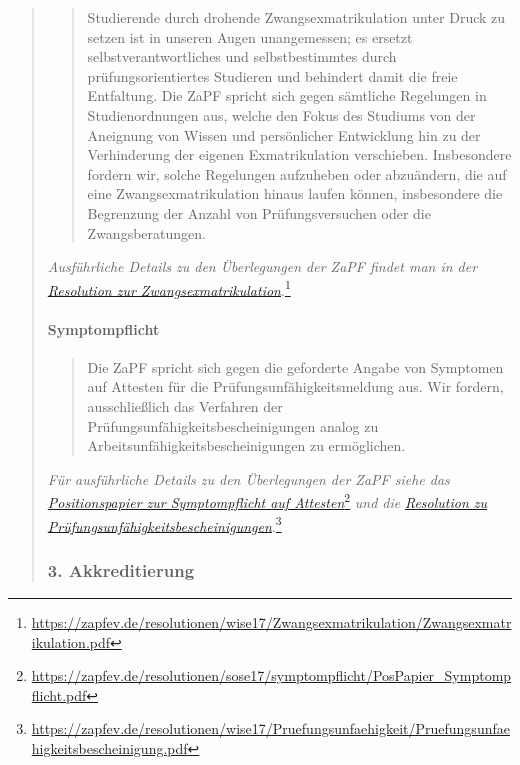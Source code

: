 \documentclass[DIV=14]{scrartcl}
\begin{document}
\begin{quote}
\begin{quote}
Studierende durch drohende Zwangsexmatrikulation unter Druck zu setzen ist in unseren Augen unangemessen; es ersetzt selbstverantwortliches und selbstbestimmtes durch prüfungsorientiertes Studieren und behindert damit die freie Entfaltung. Die ZaPF spricht sich gegen sämtliche Regelungen in Studienordnungen aus, welche den Fokus des Studiums von der Aneignung von Wissen und persönlicher Entwicklung hin zu der
Verhinderung der eigenen Exmatrikulation verschieben. Insbesondere fordern wir, solche Regelungen aufzuheben oder abzuändern, die auf eine Zwangsexmatrikulation hinaus laufen können, insbesondere die Begrenzung der Anzahl von Prüfungsversuchen oder die Zwangsberatungen.
\end{quote}

\emph{Ausführliche Details zu den Überlegungen der ZaPF findet man in der} \href{https://zapfev.de/resolutionen/wise17/Zwangsexmatrikulation/Zwangsexmatrikulation.pdf}{\emph{Resolution
zur Zwangsexmatrikulation}}.\footnote{\url{https://zapfev.de/resolutionen/wise17/Zwangsexmatrikulation/Zwangsexmatrikulation.pdf}}

\hypertarget{symptompflicht}{%
\paragraph{Symptompflicht}\label{symptompflicht}}

\begin{quote}
Die ZaPF spricht sich gegen die geforderte Angabe von Symptomen auf Attesten für die Prüfungsunfähigkeitsmeldung aus. Wir fordern, ausschließlich das Verfahren der Prüfungsunfähigkeitsbescheinigungen analog zu Arbeitsunfähigkeitsbescheinigungen zu ermöglichen.
\end{quote}

\emph{Für ausführliche Details zu den Überlegungen der ZaPF siehe das} \href{https://zapfev.de/resolutionen/sose17/symptompflicht/PosPapier_Symptompflicht.pdf}{\emph{Positionspapier
zur Symptompflicht auf Attesten}}\footnote{\url{https://zapfev.de/resolutionen/sose17/symptompflicht/PosPapier_Symptompflicht.pdf}} \emph{und die} \href{https://zapfev.de/resolutionen/wise17/Pruefungsunfaehigkeit/Pruefungsunfaehigkeitsbescheinigung.pdf}{\emph{Resolution
zu Prüfungsunfähigkeitsbescheinigungen}}.\footnote{\url{https://zapfev.de/resolutionen/wise17/Pruefungsunfaehigkeit/Pruefungsunfaehigkeitsbescheinigung.pdf}}


\hypertarget{akkreditierung}{%
\subsubsection*{3. Akkreditierung}\label{akkreditierung}}


\end{quote}
\end{document}
